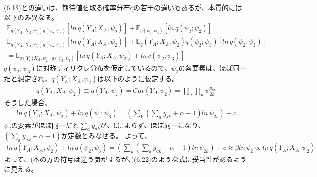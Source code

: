 ﻿\documentclass{jsarticle}
\begin{document}
(6.18)との違いは、期待値を取る確率分布qの若干の違いもあるが、本質的には以下のみ異なる。
\begin{equation}
\begin{split}
\mathbb{E}_{q(Y_A; X_A, \psi_2)q(\psi_2 ; \psi_3)} [ln \, q(Y_A; X_A, \psi_2)] + \mathbb{E}_{q(\psi_2 ; \psi_3)} [ln \, q(\psi_2 ; \psi_3)] = \\
\mathbb{E}_{q(Y_A; X_A, \psi_2)q(\psi_2 ; \psi_3)} [ln \, q(Y_A; X_A, \psi_2)] + \mathbb{E}_q(Y_A; X_A, \psi_2){q(\psi_2 ; \psi_3)} [ln \, q(\psi_2 ; \psi_3)]\\
= \mathbb{E}_{q(Y_A; X_A, \psi_2)q(\psi_2 ; \psi_3)} [ln \, q(Y_A; X_A, \psi_2) + ln \, q(\psi_2 ; \psi_3)]
\end{split}
\end{equation}
$q(\psi_2 ; \psi_3)$に対称ディリクレ分布を仮定しているので、$\psi_2$の各要素は、ほぼ同一だと想定され、$q(Y_A; X_A, \psi_2)$は以下のように仮定する。
\begin{equation}
\begin{split}
q(Y_A; X_A, \psi_2) \equiv q(Y_A; \psi_2) = Cat(Y_A | \psi_2) = \prod_a \prod_k \psi_{2k}^{y_{ak}}
\end{split}
\end{equation}
そうした場合、
\begin{equation}
\begin{split}
ln \, q(Y_A; X_A, \psi_2) + ln \, q(\psi_2 ; \psi_3)　 = (\sum_k (\sum_a y_{ak} + \alpha - 1)　ln \, \psi_{2k}) + c
\end{split}
\end{equation}
$\psi_2$の要素がほぼ同一だと$\sum_a y_{ak}$が、kによらず、ほぼ同一になり、$(\sum_a y_{ak} + \alpha - 1)$が定数とみなせる。
よって、
\begin{equation}
\begin{split}
ln \, q(Y_A; X_A, \psi_2) + ln \, q(\psi_2 ; \psi_3) = (\sum_k (\sum_a y_{ak} + \alpha - 1)　ln \, \psi_{2k}) + c \approx \beta ln \, \psi_{2} \propto ln \, q(Y_A; X_A, \psi_2)
\end{split}
\end{equation}
よって、(本の方の符号は違う気がするが、)(6.22)のような式に妥当性があるように見える。
\end{document}
